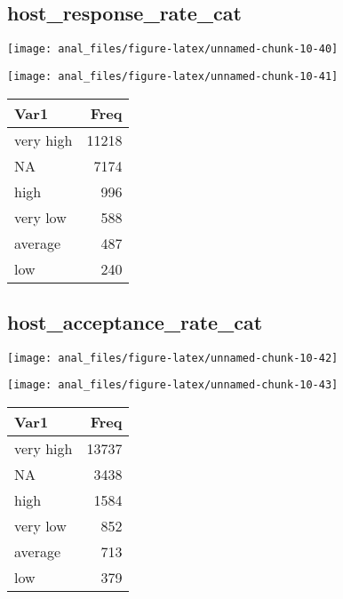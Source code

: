 \hypertarget{host_response_rate_cat}{%
\subsection{host\_response\_rate\_cat}\label{host_response_rate_cat}}

\begin{center}\texttt{[image: anal\_files/figure-latex/unnamed-chunk-10-40]} \end{center}

\begin{center}\texttt{[image: anal\_files/figure-latex/unnamed-chunk-10-41]} \end{center}

\begin{table}[H]
\centering
\begin{tabular}[t]{lr}
\toprule
Var1 & Freq\\
\midrule
very high & 11218\\
NA & 7174\\
high & 996\\
very low & 588\\
average & 487\\
\addlinespace
low & 240\\
\bottomrule
\end{tabular}
\end{table}
\pagebreak

\hypertarget{host_acceptance_rate_cat}{%
\subsection{host\_acceptance\_rate\_cat}\label{host_acceptance_rate_cat}}

\begin{center}\texttt{[image: anal\_files/figure-latex/unnamed-chunk-10-42]} \end{center}

\begin{center}\texttt{[image: anal\_files/figure-latex/unnamed-chunk-10-43]} \end{center}

\begin{table}[H]
\centering
\begin{tabular}[t]{lr}
\toprule
Var1 & Freq\\
\midrule
very high & 13737\\
NA & 3438\\
high & 1584\\
very low & 852\\
average & 713\\
\addlinespace
low & 379\\
\bottomrule
\end{tabular}
\end{table}
\pagebreak

